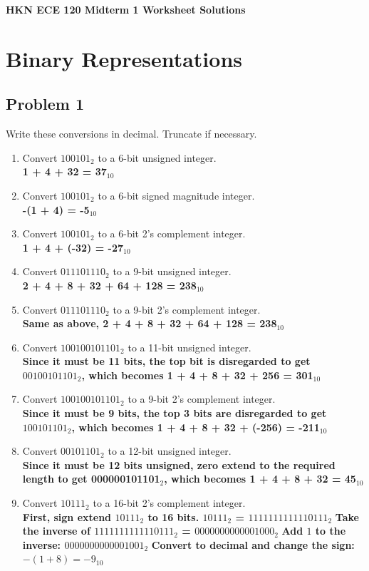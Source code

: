 \documentclass{article}
\begin{document}
\begin{center}
\textbf{
{\Large HKN ECE 120 Midterm 1 Worksheet Solutions}
}
\end{center} 
\noindent\makebox[\linewidth]{\rule{\linewidth}{0.2pt}}


\section*{Binary Representations}
\subsection*{Problem 1}
Write these conversions in decimal. Truncate if necessary.
\begin{enumerate}[label=\alph*.]
    \item Convert $100101_2$ to a 6-bit unsigned integer.\\
    \textbf{1 + 4 + 32 = 37$_{10}$}
    \item Convert $100101_2$ to a 6-bit signed magnitude integer.\\
    \textbf{-(1 + 4) = -5$_{10}$}
    \item Convert $100101_2$ to a 6-bit 2's complement integer.\\
    \textbf{1 + 4 + (-32) = -27$_{10}$}
    \item Convert $0 1110 1110_2$ to a 9-bit unsigned integer.\\
    \textbf{2 + 4 + 8 + 32 + 64 + 128 = 238$_{10}$}
    \item Convert $0 1110 1110_2$ to a 9-bit 2's complement integer.\\
    \textbf{Same as above, 2 + 4 + 8 + 32 + 64 + 128 = 238$_{10}$}
    \item Convert $1001 0010 1101_2$ to a 11-bit unsigned integer.\\
    \textbf{Since it must be 11 bits, the top bit is disregarded to get $001 0010 1101_2$, which becomes 1 + 4 + 8 + 32 + 256 = 301$_{10}$}
    \item Convert $1001 0010 1101_2$ to a 9-bit 2's complement integer.\\
    \textbf{Since it must be 9 bits, the top 3 bits are disregarded to get $1 0010 1101_2$, which becomes 1 + 4 + 8 + 32 + (-256) = -211$_{10}$}
    \item Convert $0010 1101_2$ to a 12-bit unsigned integer.\\
    \textbf{Since it must be 12 bits unsigned, zero extend to the required length to get 000000101101$_2$, which becomes 1 + 4 + 8 + 32 = 45$_{10}$}
    \item Convert $1 0111_2$ to a 16-bit 2's complement integer.\\
    \textbf{First, sign extend $1 0111_2$ to 16 bits. $1 0111_2$ = $1111 1111 1111 0111_2$}
    \newline\textbf{Take the inverse of $1111 1111 1111 0111_2$ = $0000 0000 0000 1000_2$}
    \newline\textbf{Add $1$ to the inverse: $0000 0000 0000 1001_2$}
    \newline\textbf{Convert to decimal and change the sign: $-(1 + 8) = -9_{10}$}
\end{enumerate}
\end{document}
